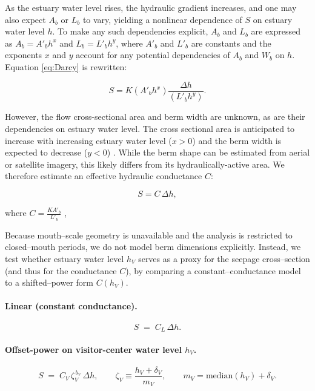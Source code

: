 \documentclass[preprint,12pt,authoryear]{elsarticle}
\begin{document}
As the estuary water level rises, the hydraulic gradient increases, and one may also expect $A_b$ or $L_b$ to vary, yielding a nonlinear dependence of $S$ on estuary water level  $ h$. To make any such dependencies explicit, $A_b$ and $L_b$ are expressed as $A_b = A'_b  h^x$ and $L_b = L'_b  h^y$, where $A'_b$ and $L'_b$ are constants and the exponents $x$ and $y$ account for any potential dependencies of $A_b$ and $W_b$ on $ h$. 
Equation \ref{eq:Darcy} is rewritten:

\begin{equation}
    S = K (A'_b  h^x) \frac{\Delta h}{ (L'_b  h^y)}.
    \label{eq:Darcy_w_exponents}
\end{equation}

However, the flow cross-sectional area and berm width are unknown, as are their dependencies on estuary water level. The cross sectional area is anticipated to increase with increasing estuary water level ($x >0$) and the berm width is expected to decrease ($y < 0$) .  While the berm shape can be estimated from aerial or satellite imagery, this likely differs from its hydraulically-active area. We therefore estimate an effective hydraulic conductance $C$:

\begin{equation}
    S = C\,\Delta h,
    \label{eq:tildeK}
\end{equation}

 \noindent where $C =  \frac{K A'_b}{ L'_b}$ ,

 Because mouth--scale geometry is unavailable and the analysis is restricted to closed--mouth periods, we do not model berm dimensions explicitly. Instead, we test whether estuary water level $h_V$ serves as a proxy for the {seepage cross--section} (and thus for the conductance $C$), by comparing a constant--conductance model to a shifted--power form $C(h_V)$.



\paragraph{Linear (constant conductance).}
\[
S \;=\; C_L\,\Delta h.
\]

\paragraph{Offset-power on visitor-center water level $h_V$.}
\[
S \;=\; C_V\,\zeta_{V}^{\,b_V}\,\Delta h,
\qquad
\zeta_V \equiv \frac{h_V + \delta_V}{m_V},\qquad
m_V = \mathrm{median}(h_V) + \delta_V.
\]
\end{document}

